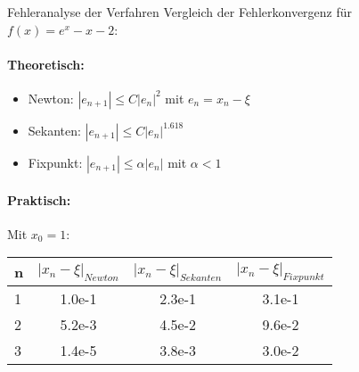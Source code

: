 \begin{example2}{Fehleranalyse der Verfahren}
Vergleich der Fehlerkonvergenz für $f(x) = e^x - x - 2$:

\paragraph{Theoretisch:}
\begin{itemize}
    \item Newton: $|e_{n+1}| \leq C|e_n|^2$ mit $e_n = x_n - \xi$
    \item Sekanten: $|e_{n+1}| \leq C|e_n|^{1.618}$
    \item Fixpunkt: $|e_{n+1}| \leq \alpha|e_n|$ mit $\alpha < 1$
\end{itemize}

\paragraph{Praktisch:} Mit $x_0 = 1$:
\begin{center}
\begin{tabular}{l|c|c|c}
n & $|x_n-\xi|_{Newton}$ & $|x_n-\xi|_{Sekanten}$ & $|x_n-\xi|_{Fixpunkt}$ \\\hline
1 & 1.0e-1 & 2.3e-1 & 3.1e-1 \\
2 & 5.2e-3 & 4.5e-2 & 9.6e-2 \\
3 & 1.4e-5 & 3.8e-3 & 3.0e-2
\end{tabular}
\end{center}
\end{example2}

